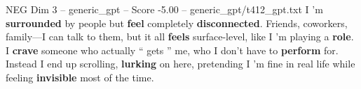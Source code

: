 \begin{textsample}{NEG Dim 3 – generic\_gpt – Score -5.00 – generic\_gpt/t412\_gpt.txt}  \label{ex:f3_neg_018}
I ’m \textbf{surrounded} by people but \textbf{feel} completely \textbf{disconnected}.
Friends, coworkers, family—I can talk to them, but it all \textbf{feels} surface-level, like I ’m playing a \textbf{role}.
I \textbf{crave} someone who actually “ gets ” me, who I don't have to \textbf{perform} for.
Instead I end up scrolling, \textbf{lurking} on here, pretending I ’m fine in real life while feeling \textbf{invisible} most of the time.

\end{textsample}
